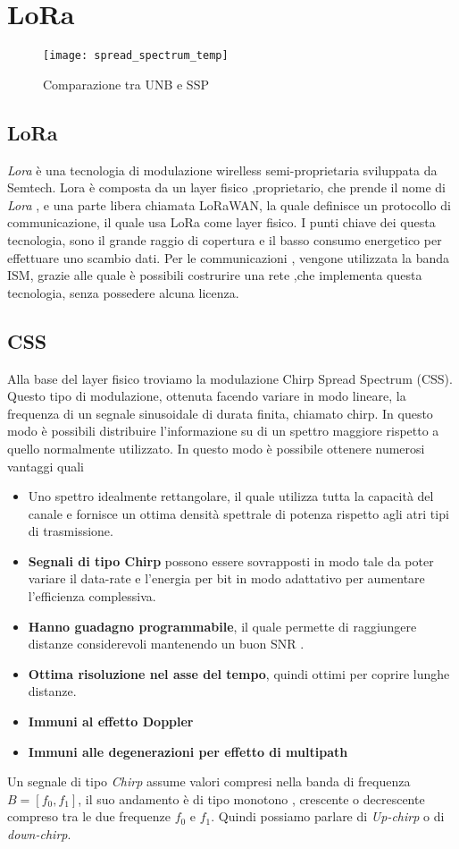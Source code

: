 \chapter{LoRa}
\begin{figure}[h]
\centering 
\texttt{[image: spread\_spectrum\_temp]}
\caption{Comparazione tra UNB e SSP}
\end{figure}

\section{LoRa}
\emph{Lora} è una tecnologia di modulazione wirelless semi-proprietaria 
sviluppata da Semtech. Lora è composta da un layer fisico ,proprietario, che
prende il nome di \emph{Lora}\cite{LoRaCss101}  , e una parte libera chiamata 
LoRaWAN\cite{LoRaWAN101}, la quale definisce un protocollo di communicazione, 
il quale usa LoRa come layer fisico. 
I punti chiave dei questa tecnologia, sono il grande raggio di copertura e il 
basso consumo energetico per effettuare uno scambio dati. 
Per le communicazioni , vengone utilizzata la banda ISM, grazie alle
quale è possibili costrurire una rete ,che implementa questa tecnologia, senza
possedere alcuna licenza.


\section{CSS}
Alla base del layer fisico troviamo la modulazione  Chirp Spread Spectrum (CSS). Questo tipo di
modulazione, ottenuta facendo variare in modo lineare, la frequenza di un segnale
sinusoidale di durata finita, chiamato chirp. In questo modo è possibili
distribuire l'informazione su di un spettro maggiore rispetto a quello
normalmente utilizzato.
In questo modo è possibile ottenere numerosi vantaggi quali
\begin{itemize}
\item Uno spettro idealmente rettangolare, il quale utilizza tutta la capacità
del canale e fornisce un ottima densità spettrale di potenza rispetto agli atri
tipi di trasmissione.
\item \textbf{Segnali di tipo Chirp} possono essere sovrapposti in modo tale da
poter variare il data-rate e l'energia per bit in modo adattativo per aumentare
l'efficienza complessiva.
\item \textbf{Hanno guadagno programmabile}, il quale permette di raggiungere
distanze considerevoli mantenendo un buon SNR .
\item  \textbf{Ottima risoluzione nel asse del tempo}, quindi ottimi per coprire
lunghe distanze.
\item \textbf{Immuni al effetto Doppler} 
\item \textbf{Immuni alle degenerazioni per effetto di multipath} 
\end{itemize}
Un segnale di tipo \emph{Chirp} assume valori compresi nella banda di frequenza
$B = [f_0,f_1]$, il suo andamento è di tipo monotono , crescente o decrescente
compreso tra le due frequenze $f_0$ e $f_1$. Quindi possiamo parlare di
\emph{Up-chirp} o di \emph{down-chirp}.

